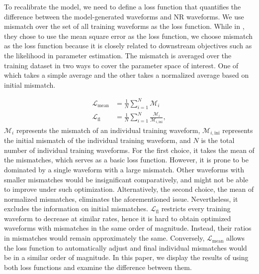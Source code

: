 \documentclass[twocolumn]{aastex631}
\begin{document}
To recalibrate the model, we need to define a loss function that quantifies the
difference between the model-generated waveforms and NR waveforms. We use
mismatch over the set of all training waveforms as the loss function. While in
\citep{khan2016frequency}, they chose to use the mean square error as the loss
function, we choose mismatch as the loss function because it is closely related
to downstream objectives such as the likelihood in parameter estimation. The
mismatch is averaged over the training dataset in two ways to cover the
parameter space of interest. One of which takes a simple average and the other
takes a normalized average based on initial mismatch.

\begin{align}
	\mathcal{L}_{\mathrm{mean}}&=\frac{1}{N}\sum_{i=1}^N\mathcal{M}_i \\
	\mathcal{L}_{\mathrm{fl}}&=\frac{1}{N}\sum_{i=1}^N\frac{\mathcal{M}_i}{\mathcal{M}_{i,\mathrm{ini}}},
\end{align}	
$\mathcal{M}_i$ represents the mismatch of an individual training waveform,
$\mathcal{M}_{i,\mathrm{ini}}$ represents the initial mismatch of the individual
training waveform, and $N$ is the total number of individual training waveforms.
For the first choice, it takes the mean of the mismatches, which serves as a
basic loss function. However, it is prone to be dominated by a single waveform
with a large mismatch. Other waveforms with smaller mismatches would be
insignificant comparatively, and might not be able to improve under such
optimization. Alternatively, the second choice, the mean of normalized
mismatches, eliminates the aforementioned issue. Nevertheless, it excludes the
information on initial mismatches. $\mathcal{L}_{\mathrm{fl}}$ restricts every
training waveform to decrease at similar rates, hence it is hard to obtain
optimized waveforms with mismatches in the same order of magnitude. Instead,
their ratios in mismatches would remain approximately the same. Conversely,
$\mathcal{L}_{\mathrm{mean}}$ allows the loss function to automatically adjust
and final individual mismatches would be in a similar order of magnitude. In
this paper, we display the results of using both loss functions and examine the
difference between them. 
\end{document}
